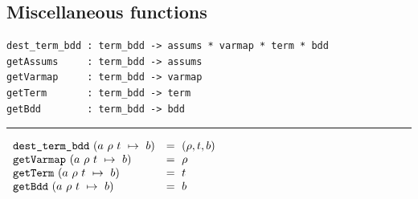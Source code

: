 \documentclass[12pt,fleqn]{article}
\renewcommand{\t}[1]{\mbox{\tt #1}}
\newcommand{\termbdd}[4]{\mbox{$#1~#2~#3~\mapsto~#4$}}
\begin{document}
\subsection{Miscellaneous functions}\label{misc}


\noindent \newsavebox\destructors
\begin{lrbox}\destructors
\begin{minipage}{\minipagewidth}

\begin{footnotesize}
\begin{verbatim}
dest_term_bdd : term_bdd -> assums * varmap * term * bdd
getAssums     : term_bdd -> assums
getVarmap     : term_bdd -> varmap
getTerm       : term_bdd -> term
getBdd        : term_bdd -> bdd
\end{verbatim}
\end{footnotesize}
\vspace*{-6mm}

\noindent \rule\minipagewidth{0.1pt}

\vspace*{1mm}

\begin{footnotesize}
\hspace*{-1.5mm}$\begin{array}{ll}
\t{dest\_term\_bdd}~(\termbdd{a}{\rho}{t}{b})&=~(\rho, t, b)\\
\t{getVarmap}~(\termbdd{a}{\rho}{t}{b})&=~\rho\\
\t{getTerm}~(\termbdd{a}{\rho}{t}{b})&=~t\\
\t{getBdd}~(\termbdd{a}{\rho}{t}{b})&=~b
\end{array}$
\end{footnotesize}
\end{minipage}
\end{lrbox}
\fbox{\usebox{\destructors}}

\bigskip

\noindent \newsavebox\inSupport
{}
\fbox{\usebox{\inSupport}}
\end{document}
